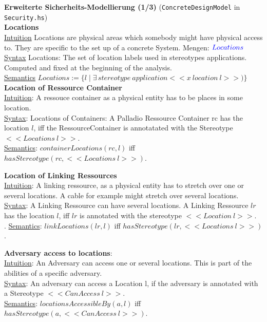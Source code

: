\textbf{Erweiterte Sicherheits-Modellierung (1/3)} (\texttt{ConcreteDesignModel} in \texttt{Security.hs})\\

\textbf{Locations} \\
\underline{Intuition} Locations are physical areas which somebody might have physical access to.
They are specific to the set up of a concrete System.
Mengen: ${\color{blue}{Locations}}$  \\
\underline{Syntax} Locations: The set of location labels used in stereotypes applications. Computed and fixed at the beginning of the analysis.\\%
\underline{Semantics} $Locations := \{l \mid \exists \, stereotype~application <<x~location~l>>)\}$\\ %

\textbf{Location of Ressource Container}\\
\underline{Intuition}: A ressouce container as a physical entity has to be places in some location.\\
\underline{Syntax}: Locations of Containers: A Palladio Ressource Container rc has the location $l$, iff the RessourceContainer is annotatated with the Stereotype $<<Locations~l>>$. \\
\underline{Semantics}: $containerLocations(rc, l)$ iff $hasStereotype(rc, <<Locations~l>>)$.

\textbf{Location of Linking Ressources}\\
\underline{Intuition}: A linking ressource, as a physical entity has to stretch over one or several locations.
A cable for example might stretch over several locations. \\
\underline{Syntax}: A Linking Ressource can have several locations.
A Linking Ressource $lr$ has the location $l$, iff $lr$ is annotated with the stereotype $<<Location~l>>$.\\
.
\underline{Semantics}: $linkLocations(lr, l)$ iff $hasStereotype(lr, <<Locations~l>>)$.

\textbf{Adversary access to locations}:\\
\underline{Intuition}: An Adversary can access one or several locations.
This is part of the abilities of a specific adversary. \\
\underline{Syntax}: An adversary can access a Location l, if the adversary is annotated with a Stereotype $<<CanAccess~l>>$.
 \\
\underline{Semantics}: $locationsAccessibleBy(a, l)$ iff $hasStereotype(a, <<CanAccess~l>>)$. \\


